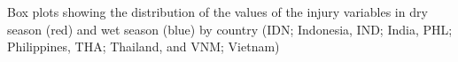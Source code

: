 Box plots showing the distribution of the values of the injury variables in dry season (red) and wet season (blue) by country (IDN; Indonesia, IND; India, PHL; Philippines, THA; Thailand, and VNM; Vietnam)
